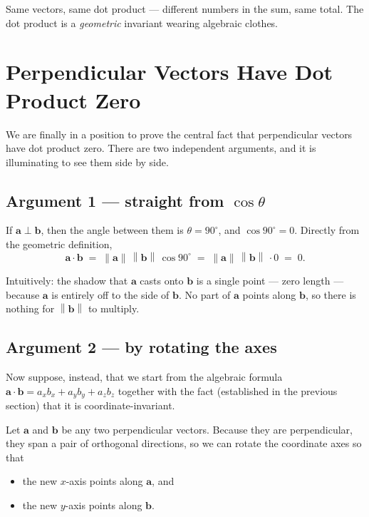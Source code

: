 \documentclass[11pt]{article}
\newcommand{\vect}[1]{\mathbf{#1}}
\newcommand{\norm}[1]{\left\lVert #1 \right\rVert}
\begin{document}
Same vectors, same dot product — different numbers in the sum, same total. The dot product is a \emph{geometric} invariant wearing algebraic clothes.

\section{Perpendicular Vectors Have Dot Product Zero}

We are finally in a position to prove the central fact that perpendicular vectors have dot product zero. There are two independent arguments, and it is illuminating to see them side by side.

\subsection*{Argument 1 — straight from $\cos\theta$}

If $\vect{a}\perp\vect{b}$, then the angle between them is $\theta = 90^\circ$, and $\cos 90^\circ = 0$. Directly from the geometric definition,
\[
  \vect{a}\cdot\vect{b} \;=\; \norm{\vect{a}}\,\norm{\vect{b}}\,\cos 90^\circ \;=\; \norm{\vect{a}}\,\norm{\vect{b}}\,\cdot 0 \;=\; 0.
\]

Intuitively: the shadow that $\vect{a}$ casts onto $\vect{b}$ is a single point — zero length — because $\vect{a}$ is entirely off to the side of $\vect{b}$. No part of $\vect{a}$ points along $\vect{b}$, so there is nothing for $\norm{\vect{b}}$ to multiply.

\subsection*{Argument 2 — by rotating the axes}

Now suppose, instead, that we start from the algebraic formula $\vect{a}\cdot\vect{b} = a_x b_x + a_y b_y + a_z b_z$ together with the fact (established in the previous section) that it is coordinate-invariant.

Let $\vect{a}$ and $\vect{b}$ be any two perpendicular vectors. Because they are perpendicular, they span a pair of orthogonal directions, so we can rotate the coordinate axes so that
\begin{itemize}
  \item the new $x$-axis points along $\vect{a}$, and
  \item the new $y$-axis points along $\vect{b}$.
\end{itemize}
\end{document}

